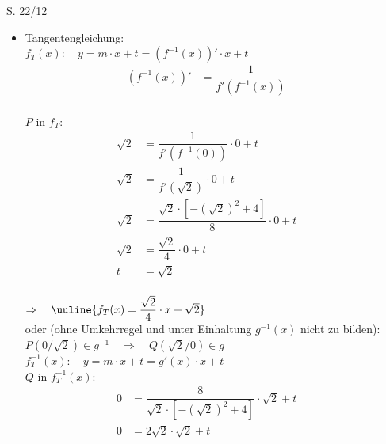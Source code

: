 \begin{Exercise}{S. 22/12}{}
\begin{enumerate}
\begin{itemize}[leftmargin=*]
{                $\Rightarrow \quad G_{g}$ ist sms in $\left] \ 0; 2 \ \right[$ und damit auf diesem Intervall umkehrbar\\[-1.0ex]
                }
            \item Tangentengleichung: \\[2.0ex]{
                $f_{T}(x): \quad y = m \cdot x + t = \left(f^{-1}(x)\right)' \cdot x + t$\\
                \vspace{-2.0ex}
                \begin{align*}
                    \left(f^{-1}(x)\right)' &= \dfrac{1}{f'\left(f^{-1}(x)\right)} &&
                \end{align*}\\[-2.0ex]
                $P$ in $f_{T}$: \\[-2.0ex]
                \begin{align*}
                    \sqrt{2} &= \dfrac{1}{f'\left(f^{-1}(0)\right)} \cdot 0 + t &&\\[1.5ex]
                    \sqrt{2} &= \dfrac{1}{f'(\sqrt{2})} \cdot 0 + t &&\\[1.5ex]
                    \sqrt{2} &= \dfrac{\sqrt{2} \cdot \left[-\left(\sqrt{2}\right)^{2} +4\right]}{8} \cdot 0 + t &&\\[1.5ex]
                    \sqrt{2} &= \dfrac{\sqrt{2}}{4} \cdot 0 + t &&\\[1.5ex]
                    t &= \sqrt{2} &&
                \end{align*}\\[-2.0ex]
                $\Rightarrow \quad \uuline{f_{T}(x) = \dfrac{\sqrt{2}}{4} \cdot x + \sqrt{2}}$\\[1.0ex]
                }
                oder (ohne Umkehrregel und unter Einhaltung $g^{-1}(x)$ nicht zu bilden):\\[2.0ex]
                $P(0/\sqrt{2}) \in g^{-1} \quad \Rightarrow \quad Q(\sqrt{2}/0) \in g$\\[2.0ex]
                $f^{-1}_{T}(x): \quad y = m \cdot x + t = g'(x) \cdot x + t$\\[2.0ex]
                $Q$ in $f^{-1}_{T}(x)$: \\[-2.0ex]
                \begin{align*}
                    0 &= \dfrac{8}{\sqrt{2} \cdot \left[-\left(\sqrt{2}\right)^{2} +4\right]} \cdot \sqrt{2} + t &&\\[1.5ex]
                    0 &= 2\sqrt{2} \cdot \sqrt{2} + t &&\\[1.5ex]

\end{align*}
\end{itemize}
\end{enumerate}
\end{Exercise}
